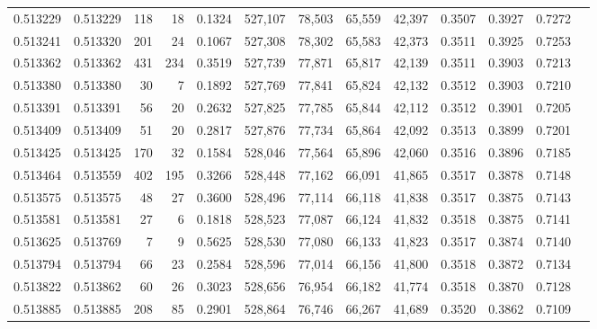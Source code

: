 \begin{tabular}{rrrrrrrrrrrrr}
0.513229 & 0.513229 &   118 &    18 &                                     0.1324 & 527,107 &  78,503 &  65,559 &  42,397 & 0.3507 & 0.3927 & 0.7272 \\
0.513241 & 0.513320 &   201 &    24 &                                     0.1067 & 527,308 &  78,302 &  65,583 &  42,373 & 0.3511 & 0.3925 & 0.7253 \\
0.513362 & 0.513362 &   431 &   234 &                                     0.3519 & 527,739 &  77,871 &  65,817 &  42,139 & 0.3511 & 0.3903 & 0.7213 \\
0.513380 & 0.513380 &    30 &     7 &                                     0.1892 & 527,769 &  77,841 &  65,824 &  42,132 & 0.3512 & 0.3903 & 0.7210 \\
0.513391 & 0.513391 &    56 &    20 &                                     0.2632 & 527,825 &  77,785 &  65,844 &  42,112 & 0.3512 & 0.3901 & 0.7205 \\
0.513409 & 0.513409 &    51 &    20 &                                     0.2817 & 527,876 &  77,734 &  65,864 &  42,092 & 0.3513 & 0.3899 & 0.7201 \\
0.513425 & 0.513425 &   170 &    32 &                                     0.1584 & 528,046 &  77,564 &  65,896 &  42,060 & 0.3516 & 0.3896 & 0.7185 \\
0.513464 & 0.513559 &   402 &   195 &                                     0.3266 & 528,448 &  77,162 &  66,091 &  41,865 & 0.3517 & 0.3878 & 0.7148 \\
0.513575 & 0.513575 &    48 &    27 &                                     0.3600 & 528,496 &  77,114 &  66,118 &  41,838 & 0.3517 & 0.3875 & 0.7143 \\
0.513581 & 0.513581 &    27 &     6 &                                     0.1818 & 528,523 &  77,087 &  66,124 &  41,832 & 0.3518 & 0.3875 & 0.7141 \\
0.513625 & 0.513769 &     7 &     9 &                                     0.5625 & 528,530 &  77,080 &  66,133 &  41,823 & 0.3517 & 0.3874 & 0.7140 \\
0.513794 & 0.513794 &    66 &    23 &                                     0.2584 & 528,596 &  77,014 &  66,156 &  41,800 & 0.3518 & 0.3872 & 0.7134 \\
0.513822 & 0.513862 &    60 &    26 &                                     0.3023 & 528,656 &  76,954 &  66,182 &  41,774 & 0.3518 & 0.3870 & 0.7128 \\
0.513885 & 0.513885 &   208 &    85 &                                     0.2901 & 528,864 &  76,746 &  66,267 &  41,689 & 0.3520 & 0.3862 & 0.7109 \\

\end{tabular}
